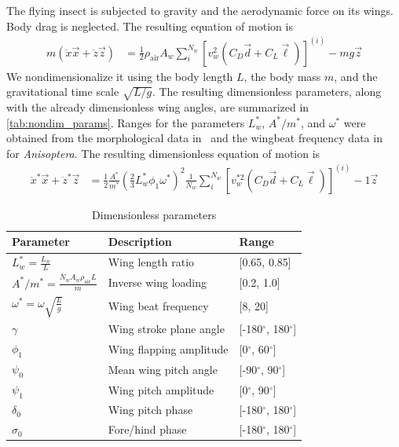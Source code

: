 \documentclass[11pt,letterpaper]{article}
\begin{document}
The flying insect is subjected to gravity and the aerodynamic
force on its wings. Body drag is neglected. The resulting equation of motion is
\begin{align}
    m \left(\ddot{x}\vec{x} + \ddot{z}\vec{z}\right) &= \frac12 \rho_\text{air} A_w \sum_i^{N_w} \left[ v_w^2 \left( C_D \vec{d} + C_L \vec{\ell} \right) \right]^{(i)} - mg\vec{z}
\end{align}
We nondimensionalize it using the body length $L$,
the body mass $m$, and the gravitational time scale $\sqrt{L/g}$.
The resulting dimensionless parameters, along with the already
dimensionless wing angles, are summarized in \autoref{tab:nondim_params}.
Ranges for the parameters
$L_w^*$, $A^* / m^*$, and $\omega^*$ were obtained from
the morphological data in~\cite{wakeling1997} and the wingbeat
frequency data in~\cite{aracheloff2024} for \emph{Anisoptera}. The
resulting dimensionless equation of motion is
\begin{align}
    \ddot{x}^*\vec{x} + \ddot{z}^*\vec{z} &= \frac12 \frac{A^*}{m^*} \left( \frac23 L_w^* \phi_1 \omega^* \right)^2 \frac{1}{N_w} \sum_i^{N_w} \left[ v_w^{*2} \left( C_D \vec{d} + C_L \vec{\ell} \right) \right]^{(i)} - 1\vec{z}
\end{align}


\begin{table}[htbp]
    \centering
    \caption{Dimensionless parameters}\label{tab:nondim_params}
    \begin{tabular}{lll}\toprule
        \textbf{Parameter} & \textbf{Description} & \textbf{Range} \\\midrule
        $L_w^* = \frac{L_w}{L}$ & Wing length ratio & [0.65, 0.85]\\
        $A^* / m^* = \frac{N_w A_w \rho_\text{air}L}{m}$ & Inverse wing loading & [0.2, 1.0]\\\midrule
        $\omega^* = \omega \sqrt{\frac{L}{g}}$ & Wing beat frequency & [8, 20]\\
        $\gamma$ & Wing stroke plane angle & [-180$^\circ$, 180$^\circ$] \\
        $\phi_1$ & Wing flapping amplitude & [0$^\circ$, 60$^\circ$] \\
        $\psi_0$ & Mean wing pitch angle & [-90$^\circ$, 90$^\circ$] \\
        $\psi_1$ & Wing pitch amplitude & [0$^\circ$, 90$^\circ$] \\
        $\delta_0$ & Wing pitch phase  & [-180$^\circ$, 180$^\circ$] \\
        $\sigma_0$ & Fore/hind phase  & [-180$^\circ$, 180$^\circ$] \\\bottomrule
    \end{tabular}
\end{table}
\end{document}
